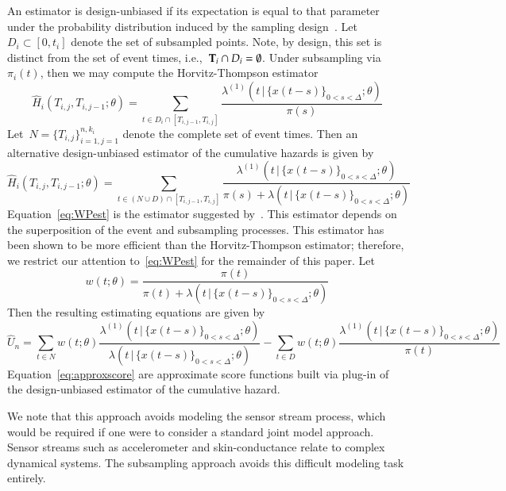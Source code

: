 \documentclass[11pt]{amsart}
\def\given{\, | \,}
\def\bfT{{\bf T}}
\begin{document}
An estimator is design-unbiased if its expectation is equal to that
parameter under the probability distribution induced by the sampling
design~\citep{Cassel1977}. Let~$D_i \subset [0,t_i]$ denote the set of
subsampled points.  Note, by design, this set is distinct from the set
of event times, i.e.,~$\bfT_i \cap D_i = \emptyset$.  Under
subsampling via $\pi_i (t)$, then we may compute the Horvitz-Thompson
estimator 
\[
\hat H_{i} (T_{i,j}, T_{i,j-1}; \theta) = \sum_{t \in D_i \cap [T_{i,j-1},
  T_{i,j}]} \frac{ \lambda^{(1)} ( t \given \{ x(t - s) \}_{0 < s <
    \Delta}; \theta ) }{ \pi (s) }
\]
Let~$N = \{ T_{i,j} \}_{i =1, j=1}^{n,k_i}$ denote the complete set of
event times.  Then an alternative design-unbiased estimator of the
cumulative hazards is given by
\begin{equation}
\label{eq:WPest}
\hat H_{i} (T_{i,j}, T_{i,j-1}; \theta) = \sum_{t \in (N \cup D) \cap [T_{i,j-1},
  T_{i,j}]} \frac{ \lambda^{(1)} ( t \given \{ x(t - s) \}_{0 < s <
    \Delta}; \theta ) }{ \pi (s) + \lambda ( t \given \{ x(t - s) \}_{0 < s <
    \Delta}; \theta) }
\end{equation}
Equation~\eqref{eq:WPest} is the estimator suggested
by~\cite{Waagepetersen2008}.  This estimator depends on the
superposition of the event and subsampling processes.  This estimator
has been shown to be more efficient than the Horvitz-Thompson
estimator; therefore, we restrict our attention to~\eqref{eq:WPest}
for the remainder of this paper. Let
\[
w (t; \theta) = \frac{\pi (t)}{\pi (t) + \lambda (t \given \{
  x(t - s) \}_{0 < s < \Delta}; \theta)}
\]
Then the resulting estimating equations are given by
\begin{equation}
\label{eq:approxscore}
\hat{U}_n = \sum_{t \in N} w(t; \theta) \frac{\lambda^{(1)} (t \given \{
  x(t - s) \}_{0 < s < \Delta}; \theta)}{ \lambda ( t \given \{
  x(t - s) \}_{0 < s < \Delta}; \theta)}  - 
\sum_{t \in D} w(t; \theta) \frac{\lambda^{(1)} (t \given \{
  x(t - s) \}_{0 < s < \Delta}; \theta)}{ \pi (t) }
\end{equation}
Equation~\eqref{eq:approxscore} are approximate score functions built
via plug-in of the design-unbiased estimator of the cumulative hazard.

We note that this approach avoids modeling the sensor stream process,
which would be required if one were to consider a standard joint model
approach.  Sensor streams such as accelerometer and skin-conductance
relate to complex dynamical systems.  The subsampling
approach avoids this difficult modeling task entirely.
\end{document}
